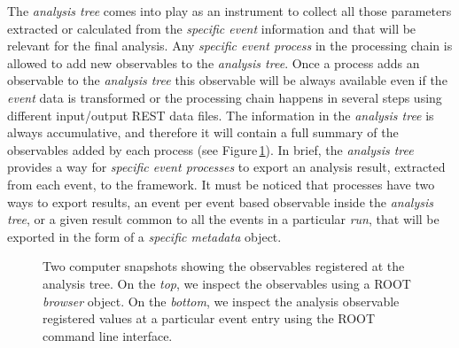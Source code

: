 The \emph{analysis tree} comes into play as an instrument to collect all those parameters extracted or calculated from the \emph{specific event} information and that will be relevant for the final analysis.  Any \emph{specific event process} in the processing chain is allowed to add new observables to the \emph{analysis tree}. Once a process adds an observable to the \emph{analysis tree} this observable will be always available even if the \emph{event} data is transformed or the processing chain happens in several steps using different input/output REST data files. The information in the \emph{analysis tree} is always accumulative, and therefore it will contain a full summary of the observables added by each process (see Figure\,\ref{fig:observables}).
In brief, the \emph{analysis tree} provides a way for \emph{specific event processes} to export an analysis result, extracted from each event, to the framework. It must be noticed that processes have two ways to export results, an event per event based observable inside the \emph{analysis tree}, or a given result common to all the events in a particular \emph{run}, that will be exported in the form of a \emph{specific metadata} object.

\begin{figure}[h]
  \centering
	\caption{Two computer snapshots showing the observables registered at the analysis tree. On the \emph{top}, we inspect the observables using a ROOT \emph{browser} object. On the \emph{bottom}, we inspect the analysis observable registered values at a particular event entry using the ROOT command line interface.}\label{fig:observables}
\end{figure}


